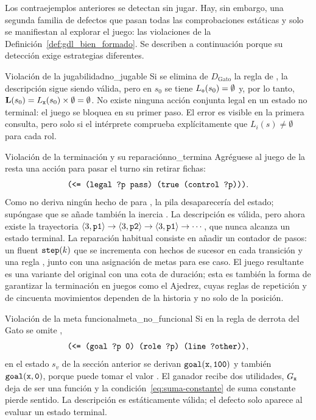 Los contraejemplos anteriores se detectan sin jugar. Hay, sin embargo, una segunda familia de defectos que pasan todas las comprobaciones estáticas y solo se manifiestan al explorar el juego: las violaciones de la Definición~\ref{def:gdl_bien_formado}. Se describen a continuación porque su detección exige estrategias diferentes.

\begin{ejemplo}{Violación de la jugabilidad}{no_jugable}
Si se elimina de $D_{\text{Gato}}$ la regla de , la descripción sigue siendo válida, pero en $s_0$ se tiene $L_{\texttt{o}}(s_0) = \emptyset$ y, por lo tanto, $\mathbf L(s_0) = L_{\texttt{x}}(s_0) \times \emptyset = \emptyset$. No existe ninguna acción conjunta legal en un estado no terminal: el juego se bloquea en su primer paso. El error es visible en la primera consulta, pero solo si el intérprete comprueba explícitamente que $L_i(s) \neq \emptyset$ para cada rol.
\end{ejemplo}

\begin{ejemplo}{Violación de la terminación y su reparación}{no_termina}
Agréguese al juego de la resta una acción para pasar el turno sin retirar fichas:
\begin{equation*}
    \texttt{(<= (legal ?p pass) (true (control ?p)))}.
\end{equation*}
Como  no deriva ningún hecho de  para , la pila desaparecería del estado; supóngase que se añade también la inercia . La descripción es válida, pero ahora existe la trayectoria $\langle 3,\texttt{p1}\rangle \to \langle 3,\texttt{p2}\rangle \to \langle 3,\texttt{p1}\rangle \to \cdots$, que nunca alcanza un estado terminal. La reparación habitual consiste en añadir un contador de pasos: un fluent $\texttt{step}(k)$ que se incrementa con hechos de sucesor en cada transición y una regla , junto con una asignación de metas para ese caso. El juego resultante es una variante del original con una cota de duración; esta es también la forma de garantizar la terminación en juegos como el Ajedrez, cuyas reglas de repetición y de cincuenta movimientos dependen de la historia y no solo de la posición.
\end{ejemplo}

\begin{ejemplo}{Violación de la meta funcional}{meta_no_funcional}
Si en la regla de derrota del Gato se omite ,
\begin{equation*}
    \texttt{(<= (goal ?p 0) (role ?p) (line ?other))},
\end{equation*}
en el estado $s_v$ de la sección anterior se derivan $\texttt{goal}(\texttt{x}, \texttt{100})$ y también $\texttt{goal}(\texttt{x}, \texttt{0})$, porque  puede tomar el valor . El ganador recibe dos utilidades, $G_{\texttt{x}}$ deja de ser una función y la condición~\eqref{eq:suma-constante} de suma constante pierde sentido. La descripción es estáticamente válida; el defecto solo aparece al evaluar un estado terminal.
\end{ejemplo}

